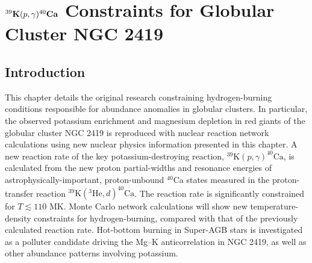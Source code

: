 \chapter{\texorpdfstring{$^{39}\mathrm{\textbf{K}}(\MakeLowercase{p},\gamma)^{40}\mathrm{\textbf{C\MakeLowercase{a}}}$}{39K(p,g)40Ca} Constraints for Globular Cluster NGC 2419}
\label{ch:GC}

\section{Introduction}


This chapter details the original research constraining hydrogen-burning conditions responsible for abundance anomalies in globular clusters. In particular, the observed potassium enrichment and magnesium depletion in red giants of the globular cluster NGC 2419 is reproduced with nuclear reaction network calculations using new nuclear physics information presented in this chapter. A new reaction rate of the key potassium-destroying reaction, $^{39}\mathrm{K}(p,\gamma)^{40}\mathrm{Ca}$, is calculated from the new proton partial-widths and resonance energies of astrophysically-important, proton-unbound $^{40}$Ca states measured in the proton-transfer reaction $^{39}\mathrm{K}(^{3}\mathrm{He},d)^{40}\mathrm{Ca}$. The reaction rate is significantly constrained for $T \lesssim 110$ MK. Monte Carlo network calculations will show new temperature-density constraints for hydrogen-burning, compared with that of the previously calculated reaction rate. Hot-bottom burning in Super-AGB stars is investigated as a polluter candidate driving the Mg--K anticorrelation in NGC 2419, as well as other abundance patterns involving potassium.

